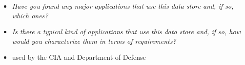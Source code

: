 
\begin{itemize}
\item \emph{Have you found any major applications that use this data store and, if so, which ones?}
\item \emph{Is there a typical kind of applications that use this data store and, if so, how would you characterize them in terms of requirements?}

\item used by the CIA and Department of Defense
\end{itemize}
